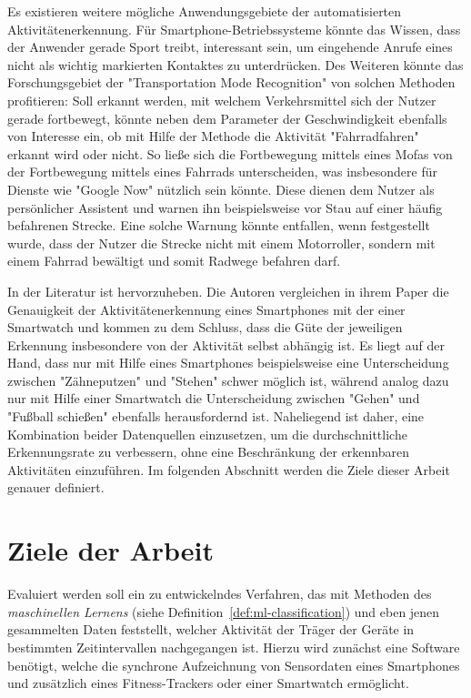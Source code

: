 Es existieren weitere mögliche Anwendungsgebiete der automatisierten Aktivitätenerkennung. Für Smartphone-Betriebssysteme könnte das Wissen, dass der Anwender gerade Sport treibt, interessant sein, um eingehende Anrufe eines nicht als wichtig markierten Kontaktes zu unterdrücken. Des Weiteren könnte das Forschungsgebiet der "Transportation Mode Recognition" von solchen Methoden profitieren: Soll erkannt werden, mit welchem Verkehrsmittel sich der Nutzer gerade fortbewegt, könnte neben dem Parameter der Geschwindigkeit ebenfalls von Interesse ein, ob mit Hilfe der Methode die Aktivität "Fahrradfahren" erkannt wird oder nicht. So ließe sich die Fortbewegung mittels eines Mofas von der Fortbewegung mittels eines Fahrrads unterscheiden, was insbesondere für Dienste wie "Google Now" nützlich sein könnte. Diese dienen dem Nutzer als persönlicher Assistent und warnen ihn beispielsweise vor Stau auf einer häufig befahrenen Strecke. Eine solche Warnung könnte entfallen, wenn festgestellt wurde, dass der Nutzer die Strecke nicht mit einem Motorroller, sondern mit einem Fahrrad bewältigt und somit Radwege befahren darf.

In der Literatur ist \cite{Weiss2016} hervorzuheben. Die Autoren vergleichen in ihrem Paper die Genauigkeit der Aktivitätenerkennung eines Smartphones mit der einer Smartwatch und kommen zu dem Schluss, dass die Güte der jeweiligen Erkennung insbesondere von der Aktivität selbst abhängig ist. Es liegt auf der Hand, dass nur mit Hilfe eines Smartphones beispielsweise eine Unterscheidung zwischen "Zähneputzen" und "Stehen" schwer möglich ist, während analog dazu nur mit Hilfe einer Smartwatch die Unterscheidung zwischen "Gehen" und "Fußball schießen" ebenfalls herausfordernd ist. Naheliegend ist daher, eine Kombination beider Datenquellen einzusetzen, um die durchschnittliche Erkennungsrate zu verbessern, ohne eine Beschränkung der erkennbaren Aktivitäten einzuführen. Im folgenden Abschnitt werden die Ziele dieser Arbeit genauer definiert.

\section{Ziele der Arbeit} %
\label{sec:goals}
Evaluiert werden soll ein zu entwickelndes Verfahren, das mit Methoden des \textit{maschinellen Lernens} (siehe Definition~\ref{def:ml-classification}) und eben jenen gesammelten Daten feststellt, welcher Aktivität der Träger der Geräte in bestimmten Zeitintervallen nachgegangen ist. Hierzu wird zunächst eine Software benötigt, welche die synchrone Aufzeichnung von Sensordaten eines Smartphones und zusätzlich eines Fitness-Trackers oder einer Smartwatch ermöglicht.

